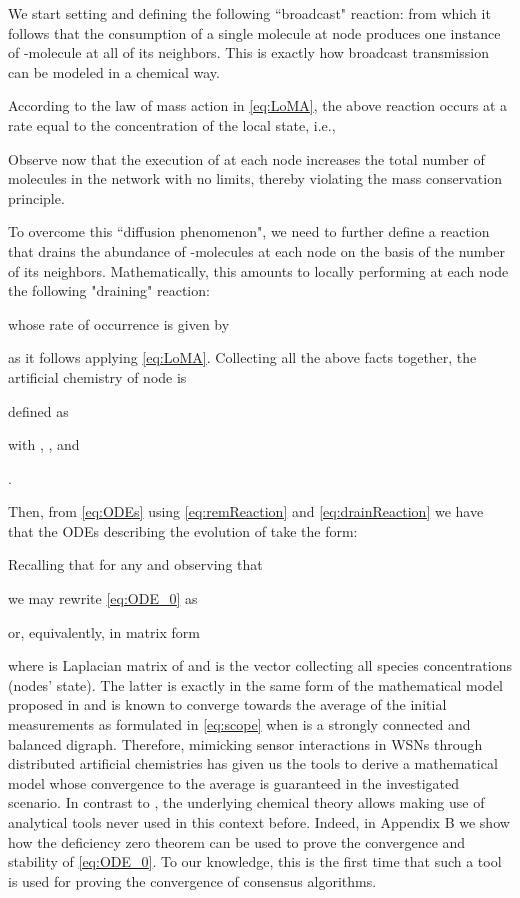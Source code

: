 \documentclass[journal]{IEEEtran}
\begin{document}
{We start setting  and defining the following ``broadcast" reaction:}
from which it follows that the consumption of a single molecule  at node  produces one instance of -molecule {at all of its neighbors}. This is exactly how broadcast transmission can be modeled in a chemical way. {According to the law of mass action in \eqref{eq:LoMA}, the above reaction occurs at a rate equal to the concentration of the local state, i.e.,

Observe now that the execution of  at each node increases the total number of molecules in the network with no limits, thereby violating the mass conservation principle.} 
To overcome this {``diffusion phenomenon"}, we need to further define a reaction that drains the abundance of -molecules at each node on the basis of the number of its neighbors. Mathematically, this amounts to locally performing at each node the following {"draining"} reaction:

 {whose rate of occurrence is given by  

as it follows applying \eqref{eq:LoMA}. Collecting all the above facts together, the artificial chemistry of node  is { defined as 

with , ,  and }.

}
Then, from \eqref{eq:ODEs} using \eqref{eq:remReaction} and \eqref{eq:drainReaction} we have that the ODEs describing the evolution of  take the form: 

Recalling that  for any  and observing that 

we may rewrite \eqref{eq:ODE_0} as

or, equivalently, in matrix form

where  is {Laplacian matrix} of  and  is the vector collecting all species concentrations (nodes' state).
The latter is exactly in the same form of the mathematical model proposed in \cite{OlMu04} and is known to converge towards the average of the initial measurements as formulated in \eqref{eq:scope} when  is a strongly connected and {balanced digraph}. {Therefore, mimicking sensor interactions in WSNs through distributed artificial chemistries has given us the tools to derive a mathematical model whose convergence to the average is guaranteed in the investigated scenario. {In contrast to} \cite{OlMu04}, the underlying chemical theory allows making use of analytical tools never used in this context before. Indeed, in Appendix B we show how the deficiency zero theorem can be used to prove the convergence and stability of \eqref{eq:ODE_0}. To our knowledge, this is the first time that such a tool is used for proving the convergence of consensus algorithms.}
\end{document}
